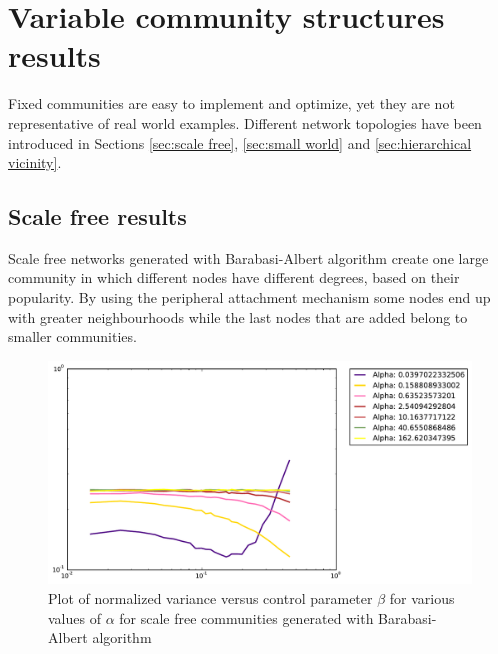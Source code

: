 \section{Variable community structures results}
\label{sec:hierarchical}

Fixed communities are easy to implement and optimize, yet they are not representative of real world examples.
Different network topologies have been introduced in Sections \ref{sec:scale free}, \ref{sec:small world} and \ref{sec:hierarchical vicinity}.

\subsection{Scale free results}

Scale free networks generated with Barabasi-Albert algorithm create one large community in which different nodes have different degrees, based on their popularity.
By using the peripheral attachment mechanism some nodes end up with greater neighbourhoods while the last nodes that are added belong to smaller communities.

\begin{figure}[h]
\begin{center}
\includegraphics[scale=0.4]{images/results/vicinity_Barabasi_n403_rounds10000_partial.pdf}
\caption{Plot of normalized variance versus control parameter $\beta$ for various values of $\alpha$  for scale free communities generated with Barabasi-Albert algorithm}
\label{fig:scale free vicinity partial}
\end{center}
\end{figure}

